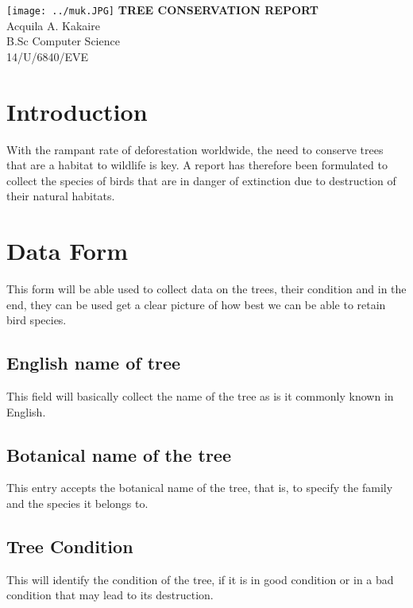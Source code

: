 \documentclass[10pt,a4paper]{article}
\begin{document}
\begin{center}
\texttt{[image: ../muk.JPG]}   \vfill
  {\Huge \textbf{TREE CONSERVATION REPORT}}
  \vspace{5cm}
  \\{\LARGE Acquila A. Kakaire}
  \vspace{1.5cm}
  \\{\Large B.Sc Computer Science}
  \vspace{1.5cm}
  \\{\Large 14/U/6840/EVE}
  \date{\today}
  \vspace{7.5cm}
		
\end{center}
\newpage

\section{Introduction}
With the rampant rate of deforestation worldwide, the need to conserve trees that are a habitat to wildlife is key. A report has therefore been formulated to collect the species of birds that are in danger of extinction due to destruction of their natural habitats.

\section{Data Form}
This form will be able used to collect data on the trees, their condition and in the end, they can be used get a clear picture of how  best we can be able to retain bird species.

\subsection{English name of tree}
This field will basically collect the name of the tree as is it commonly known in English.

\subsection {Botanical name of the tree}
This entry accepts the botanical name of the tree, that is, to specify the family and the species it belongs to.

\subsection {Tree Condition}
This will identify the condition of the tree, if it is in good condition or in a bad condition that may lead to its destruction.
\end{document}
